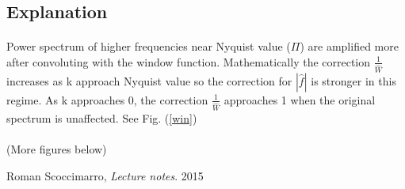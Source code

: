 \subsection{Explanation}
\paragraph{}
Power spectrum of higher frequencies near Nyquist value ($\Pi$) are amplified more after convoluting with the window function. Mathematically the correction  $\frac{1}{\hat{W}}$ increases as k approach Nyquist value so the correction for  $|\hat{f}|$ is stronger in this regime. As k approaches 0, the correction $\frac{1}{\hat{W}}$ approaches 1 when the original spectrum is unaffected. See Fig. (\ref{win})

\paragraph{}
(More figures below)


\begin{thebibliography}{9}


  Roman Scoccimarro,
  \emph{Lecture notes}. 2015
  \label{roman}
\end{thebibliography}



